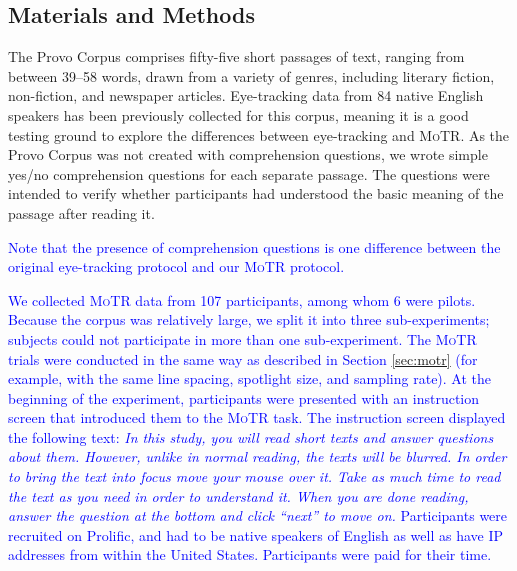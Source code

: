 \documentclass[12pt]{article}
\newcommand{\motr}{\textsc{MoTR}\xspace}
\newcommand{\word}[1]{\textit{#1}}
\newcommand{\change}[1]{\textcolor{blue}{#1}}
\begin{document}
\subsection{Materials and Methods}

The Provo Corpus comprises fifty-five short passages of text, ranging from between 39--58 words, drawn from a variety of genres, including literary fiction, non-fiction, and newspaper articles. Eye-tracking data from 84 native English speakers has been previously collected for this corpus, meaning it is a good testing ground to explore the differences between eye-tracking and \motr. As the Provo Corpus was not created with comprehension questions, we wrote simple yes/no comprehension questions for each separate passage. The questions were intended to verify whether participants had understood the basic meaning of the passage after reading it. \change{Note that the presence of comprehension questions is one difference between the original eye-tracking protocol and our \motr protocol.

We collected \motr data from \change{107 participants, among whom 6 were pilots}. Because the corpus was relatively large, we split it into three sub-experiments; subjects could not participate in more than one sub-experiment. The \motr trials were conducted in the same way as described in Section \ref{sec:motr} (for example, with the same line spacing, spotlight size, and sampling rate). At the beginning of the experiment, participants were presented with an instruction screen that introduced them to the \motr task. The instruction screen displayed the following text: \word{In this study, you will read short texts and answer questions about them. However, unlike in normal reading, the texts will be blurred. In order to bring the text into focus move your mouse over it. Take as much time to read the text as you need in order to understand it. When you are done reading, answer the question at the bottom and click ``next'' to move on.} Participants were recruited on Prolific, and had to be native speakers of English as well as have IP addresses from within the United States. Participants were paid for their time.

}
\end{document}
